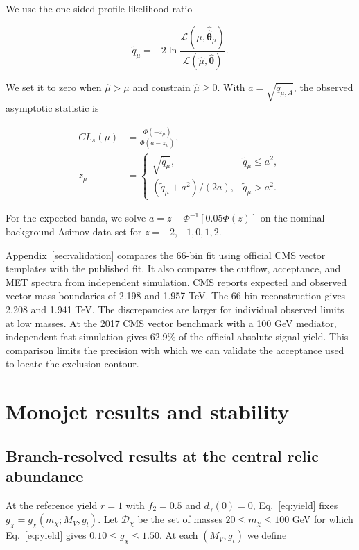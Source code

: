 \documentclass[aps,prd,reprint,superscriptaddress,longbibliography,floatfix]{revtex4-2}
\begin{document}
We use the one-sided profile likelihood ratio

\begin{equation*}
\tilde q_\mu=-2\ln\frac{\mathcal L(\mu,\widehat{\widehat{\boldsymbol\theta}}_\mu)}{\mathcal L(\widehat\mu,\widehat{\boldsymbol\theta})}.
\end{equation*}

We set it to zero when $\widehat\mu>\mu$ and constrain $\widehat\mu\ge0$. With $a=\sqrt{\tilde q_{\mu,A}}$, the observed asymptotic statistic is

\begin{equation}
\label{eq:cls}
\begin{aligned}
CL_s(\mu)&=\frac{\Phi(-z_\mu)}{\Phi(a-z_\mu)},\\
z_\mu&=\begin{cases}\sqrt{\tilde q_\mu},&\tilde q_\mu\le a^2,\\
(\tilde q_\mu+a^2)/(2a),&\tilde q_\mu>a^2.\end{cases}
\end{aligned}
\end{equation}

For the expected bands, we solve $a=z-\Phi^{-1}[0.05\Phi(z)]$ on the nominal background Asimov data set for $z=-2,-1,0,1,2$. \cite{cowan2011}

Appendix~\ref{sec:validation} compares the 66-bin fit using official CMS vector templates with the published fit. It also compares the cutflow, acceptance, and MET spectra from independent simulation. CMS reports expected and observed vector mass boundaries of 2.198 and 1.957 TeV. The 66-bin reconstruction gives 2.208 and 1.941 TeV. The discrepancies are larger for individual observed limits at low masses. At the 2017 CMS vector benchmark with a 100 GeV mediator, independent fast simulation gives 62.9\% of the official absolute signal yield. This comparison limits the precision with which we can validate the acceptance used to locate the exclusion contour.

\section{Monojet results and stability}
\label{sec:monojet_results}

\subsection{Branch-resolved results at the central relic abundance}

At the reference yield $r=1$ with $f_2=0.5$ and $d_\gamma(0)=0$, Eq.~\eqref{eq:yield} fixes $g_\chi=g_\chi(m_\chi;M_V,g_t)$. Let $\mathcal D_\chi$ be the set of masses $20\le m_\chi\le100$ GeV for which Eq.~\eqref{eq:yield} gives $0.10\le g_\chi\le1.50$. At each $(M_V,g_t)$ we define
\end{document}

